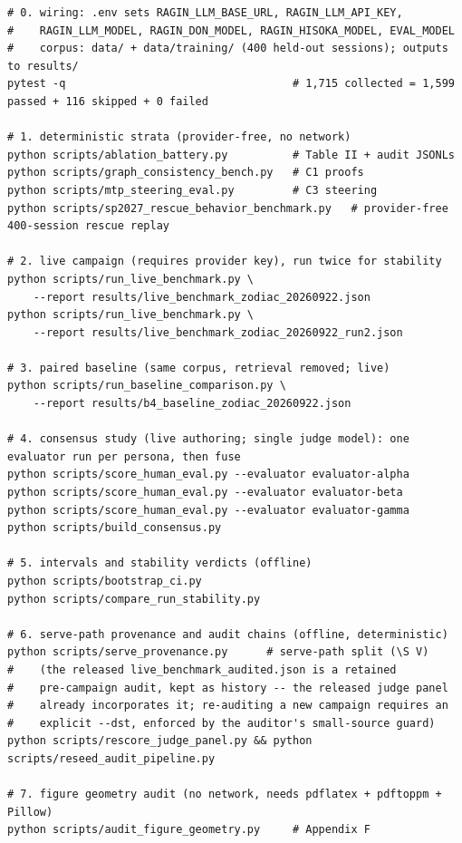 \begin{lstlisting}[style=code,float=tb,caption={Full reproduction sequence. Each step writes the artifact that backs its section. Steps 1 and 5--7 are provider-free (offline, deterministic); steps 2--4 are live and require the \texttt{.env} provider key.},label={lst:repro}]
# 0. wiring: .env sets RAGIN_LLM_BASE_URL, RAGIN_LLM_API_KEY,
#    RAGIN_LLM_MODEL, RAGIN_DON_MODEL, RAGIN_HISOKA_MODEL, EVAL_MODEL
#    corpus: data/ + data/training/ (400 held-out sessions); outputs to results/
pytest -q                                   # 1,715 collected = 1,599 passed + 116 skipped + 0 failed

# 1. deterministic strata (provider-free, no network)
python scripts/ablation_battery.py          # Table II + audit JSONLs
python scripts/graph_consistency_bench.py   # C1 proofs
python scripts/mtp_steering_eval.py         # C3 steering
python scripts/sp2027_rescue_behavior_benchmark.py   # provider-free 400-session rescue replay

# 2. live campaign (requires provider key), run twice for stability
python scripts/run_live_benchmark.py \
    --report results/live_benchmark_zodiac_20260922.json
python scripts/run_live_benchmark.py \
    --report results/live_benchmark_zodiac_20260922_run2.json

# 3. paired baseline (same corpus, retrieval removed; live)
python scripts/run_baseline_comparison.py \
    --report results/b4_baseline_zodiac_20260922.json

# 4. consensus study (live authoring; single judge model): one evaluator run per persona, then fuse
python scripts/score_human_eval.py --evaluator evaluator-alpha
python scripts/score_human_eval.py --evaluator evaluator-beta
python scripts/score_human_eval.py --evaluator evaluator-gamma
python scripts/build_consensus.py

# 5. intervals and stability verdicts (offline)
python scripts/bootstrap_ci.py
python scripts/compare_run_stability.py

# 6. serve-path provenance and audit chains (offline, deterministic)
python scripts/serve_provenance.py      # serve-path split (\S V)
#    (the released live_benchmark_audited.json is a retained
#    pre-campaign audit, kept as history -- the released judge panel
#    already incorporates it; re-auditing a new campaign requires an
#    explicit --dst, enforced by the auditor's small-source guard)
python scripts/rescore_judge_panel.py && python scripts/reseed_audit_pipeline.py

# 7. figure geometry audit (no network, needs pdflatex + pdftoppm + Pillow)
python scripts/audit_figure_geometry.py     # Appendix F
\end{lstlisting}

